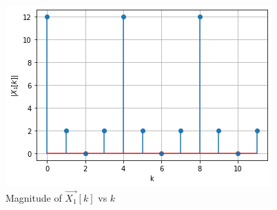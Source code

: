 \documentclass[journal,12pt,twocolumn]{IEEEtran}
\begin{document}
\begin{figure}[!ht]
    \centering
    \includegraphics[width=\columnwidth] {Gate_Assignment_1_Fig_2.png}
    \caption{Magnitude of $\vec{X_{1}}[k]$ vs $k$}
    \label{Magnitude of X1[k]}
\end{figure}
\end{document}

